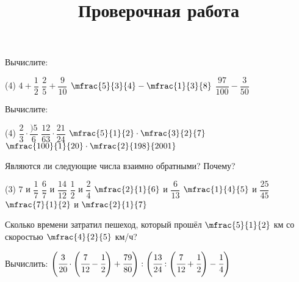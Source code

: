 %
\begin{exam}
	\title{Проверочная работа}
	\begin{listofex}
		\item Вычислите:
		\begin{tasks}(4)
			\task \( 4+\dfrac{1}{2} \)
			\task \( \dfrac{2}{5}+\dfrac{9}{10} \)
			\task \( \mfrac{5}{3}{4}-\mfrac{1}{3}{8} \)
			\task \( \dfrac{97}{100}-\dfrac{3}{50} \)
		\end{tasks}
		\item Вычислите:
		\begin{tasks}(4)
			\task \( \dfrac{2}{3}\cdot\dfrac{)5}{6} \)
			\task \( \dfrac{12}{63}\cdot\dfrac{21}{24} \)
			\task \( \mfrac{5}{1}{2}\cdot\mfrac{3}{2}{7} \)
			\task \( \mfrac{100}{1}{20}\cdot\mfrac{2}{198}{2001} \)
		\end{tasks}
		\item Являются ли следующие числа взаимно обратными? Почему?
		\begin{tasks}(3)
			\task \( 7 \) и \( \dfrac{1}{7} \)
			\task \( \dfrac{6}{7} \) и \( \dfrac{14}{12} \)
			\task \( \dfrac{1}{2} \) и \( \dfrac{2}{4} \)
			\task \( \mfrac{2}{1}{6} \) и \( \dfrac{6}{13} \)
			\task \( \mfrac{1}{4}{5} \) и \( \dfrac{25}{45} \)
			\task \( \mfrac{7}{1}{2} \) и \( \mfrac{2}{1}{7} \)
		\end{tasks}			
		\item Сколько времени затратил пешеход, который прошёл \( \mfrac{5}{1}{2} \) км со скоростью \( \mfrac{4}{2}{5} \) км/ч?
		\item Вычислить: \( \left( \cfrac{3}{20}\cdot\left( \cfrac{7}{12}-\cfrac{1}{2} \right)+\cfrac{79}{80} \right):\left( \cfrac{13}{24}:\left( \cfrac{7}{12}+\cfrac{1}{2} \right)-\cfrac{1}{4} \right) \)
	\end{listofex}
\end{exam}

